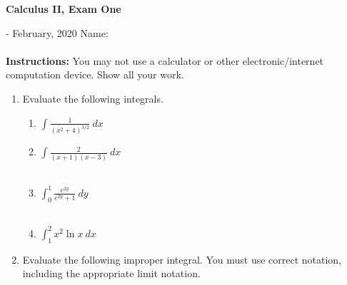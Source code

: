 \documentclass[12pt]{article}
\begin{document}
\begin{center}
\textbf{Calculus II, Exam One}
\end{center}
\bigskip

 - February, 2020\hspace*{\fill} Name: \hrulefill\\ \\
{\bf Instructions:} You may not use a calculator or other electronic/internet computation device.  Show all your work.\\
\begin{enumerate}
\item Evaluate the following integrals. 
\begin{enumerate}
%
% 
 \item $\displaystyle \int \frac{1}{(x^2+4)^{3/2}}\ dx$\\

\pagebreak


\item $\displaystyle \int \frac{2}{(x+1)(x-3)} \ dx$ \\ \\
\pagebreak
\item $\displaystyle \int_0^1 \frac{e^{2y}}{e^{2y}+1} \ dy$  \\ \\
\pagebreak
\item  $\displaystyle \int_1^2 x^2\ln x\ dx$ 
\end{enumerate}
\pagebreak
\item Evaluate the following improper integral.  You must use correct notation, including the appropriate limit notation.\\


\end{enumerate}
\end{document}
